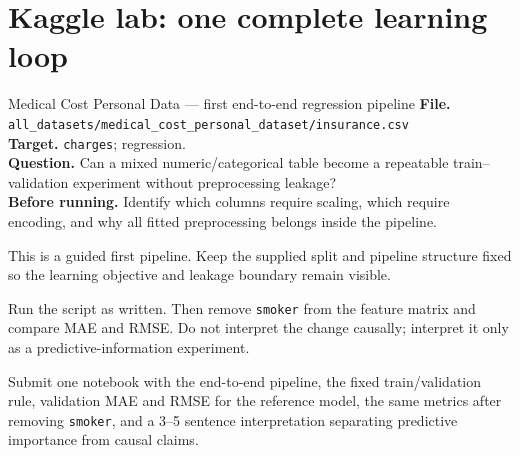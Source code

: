 \section{Kaggle lab: one complete learning loop}
\label{sec:kaggle-insurance-loop}

\begin{kaggleproject}{Medical Cost Personal Data --- first end-to-end regression pipeline}
\textbf{File.} \texttt{all\_datasets/medical\_cost\_personal\_dataset/insurance.csv}\\
\textbf{Target.} \texttt{charges}; regression.\\
\textbf{Question.} Can a mixed numeric/categorical table become a repeatable train--validation experiment without preprocessing leakage?\\
\textbf{Before running.} Identify which columns require scaling, which require encoding, and why all fitted preprocessing belongs inside the pipeline.

\begin{labmode}
This is a guided first pipeline. Keep the supplied split and pipeline structure fixed so the learning objective and leakage boundary remain visible.
\end{labmode}




\begin{tryit}
Run the script as written. Then remove \texttt{smoker} from the feature matrix and compare MAE and RMSE. Do not interpret the change causally; interpret it only as a predictive-information experiment.
\end{tryit}
\end{kaggleproject}

\begin{labdeliverable}
Submit one notebook with the end-to-end pipeline, the fixed train/validation rule, validation MAE and RMSE for the reference model, the same metrics after removing \texttt{smoker}, and a 3--5 sentence interpretation separating predictive importance from causal claims.
\end{labdeliverable}

